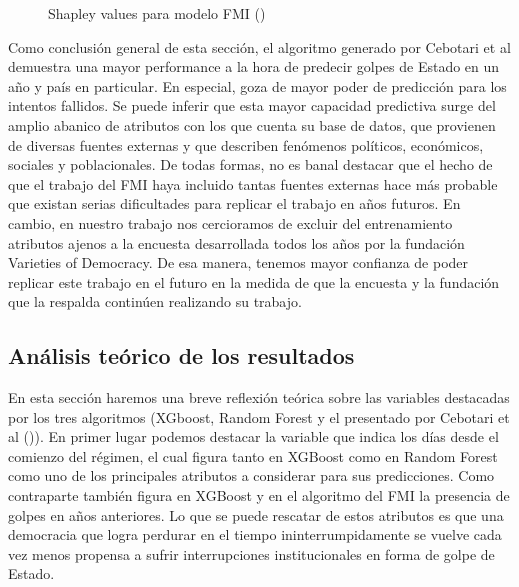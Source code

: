 \documentclass{article}
\begin{document}
\begin{figure}[H]
 \centering
 \caption{Shapley values para modelo FMI (\cite{Ceb24}) \label{fig:shapley_cebotari}}
\end{figure}

Como conclusión general de esta sección, el algoritmo generado por Cebotari et al demuestra una mayor 
performance a la hora de predecir golpes de Estado en un año y país en particular. En especial, goza
de mayor poder de predicción para los intentos fallidos. Se puede inferir que esta mayor capacidad
predictiva surge del amplio abanico de atributos con los que cuenta su base de datos, que provienen de
diversas fuentes externas y que describen fenómenos políticos, económicos, sociales y poblacionales. De
todas formas, no es banal destacar que el hecho de que el trabajo del FMI haya incluido tantas fuentes
externas hace más probable que existan serias dificultades para replicar el trabajo en años futuros. En 
cambio, en nuestro trabajo nos cercioramos de excluir del entrenamiento atributos ajenos a la encuesta
desarrollada todos los años por la fundación Varieties of Democracy. De esa manera, tenemos mayor 
confianza de poder replicar este trabajo en el futuro en la medida de que la encuesta y la fundación 
que la respalda continúen realizando su trabajo.

\subsection{Análisis teórico de los resultados}

En esta sección haremos una breve reflexión teórica sobre las variables destacadas por los tres 
algoritmos (XGboost, Random Forest y el presentado por Cebotari et al (\citeyear{Ceb24})). En primer lugar
podemos destacar la variable que indica los días desde el comienzo del régimen, el cual figura tanto en 
XGBoost como en Random Forest como uno de los principales atributos a considerar para sus predicciones.
Como contraparte también figura en XGBoost y en el algoritmo del FMI la presencia de golpes en años
anteriores. Lo que se puede rescatar de estos atributos es que una democracia que logra perdurar en el
tiempo ininterrumpidamente se vuelve cada vez menos propensa a sufrir interrupciones institucionales en
forma de golpe de Estado.
\end{document}
